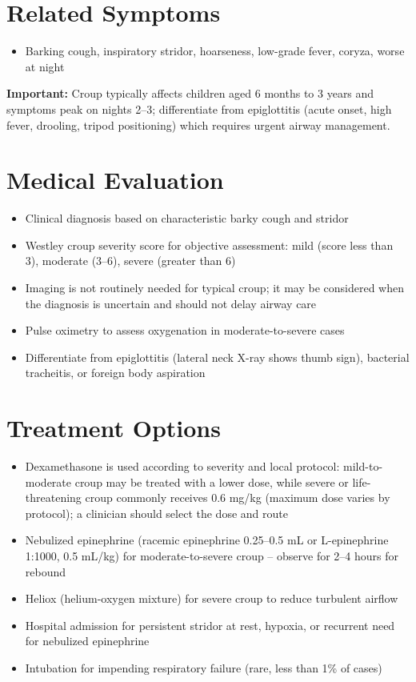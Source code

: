 \section*{Related Symptoms}
\begin{itemize}
  \item Barking cough, inspiratory stridor, hoarseness, low-grade fever, coryza, worse at night
\end{itemize}
\textbf{Important:} Croup typically affects children aged 6 months to 3 years and symptoms peak on nights 2--3; differentiate from epiglottitis (acute onset, high fever, drooling, tripod positioning) which requires urgent airway management.

\section*{Medical Evaluation}
\begin{itemize}
  \item Clinical diagnosis based on characteristic barky cough and stridor
  \item Westley croup severity score for objective assessment: mild (score less than 3), moderate (3--6), severe (greater than 6)
  \item Imaging is not routinely needed for typical croup; it may be considered when the diagnosis is uncertain and should not delay airway care
  \item Pulse oximetry to assess oxygenation in moderate-to-severe cases
  \item Differentiate from epiglottitis (lateral neck X-ray shows thumb sign), bacterial tracheitis, or foreign body aspiration
\end{itemize}

\section*{Treatment Options}
\begin{itemize}
  \item Dexamethasone is used according to severity and local protocol: mild-to-moderate croup may be treated with a lower dose, while severe or life-threatening croup commonly receives 0.6 mg/kg (maximum dose varies by protocol); a clinician should select the dose and route
  \item Nebulized epinephrine (racemic epinephrine 0.25--0.5 mL or L-epinephrine 1:1000, 0.5 mL/kg) for moderate-to-severe croup -- observe for 2--4 hours for rebound
  \item Heliox (helium-oxygen mixture) for severe croup to reduce turbulent airflow
  \item Hospital admission for persistent stridor at rest, hypoxia, or recurrent need for nebulized epinephrine
  \item Intubation for impending respiratory failure (rare, less than 1\% of cases)
\end{itemize}

